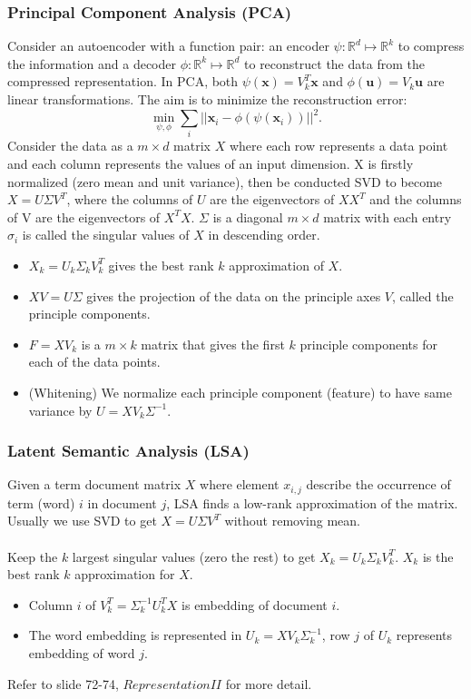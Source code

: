 \documentclass{article}
\begin{document}
   \subsubsection{Principal Component Analysis (PCA)}
   Consider an autoencoder with a function pair: an encoder $\psi:\mathbb{R}^d \mapsto \mathbb{R}^k$ to compress the information and a decoder $\phi:\mathbb{R}^k \mapsto \mathbb{R}^d$ to reconstruct the data from the compressed representation. In PCA, both $\psi(\mathbf{x})=V_k^T \mathbf{x}$ and $\phi(\mathbf{u}) = V_k \mathbf{u}$ are linear transformations. The aim is to minimize the reconstruction error: 
   \begin{equation}
   \min_{\psi, \phi} \sum_i || \mathbf{x}_i - \phi(\psi(\mathbf{x}_i)) ||^2.
   \end{equation}
   Consider the data as a $m \times d$ matrix $X$ where each row represents a data point and each column represents the values of an input dimension. X is firstly normalized (zero mean and unit variance), then be conducted SVD to become $X = U \Sigma V^T$, where the columns of $U$ are the eigenvectors of $XX^T$ and the columns of V are the eigenvectors of $X^TX$. $\Sigma$ is a diagonal $m \times d$ matrix with each entry $\sigma_i$ is called the singular values of $X$ in descending order. 
   \begin{itemize}
   \item $X_k = U_k \Sigma_k V_k^T$ gives the best rank $k$ approximation of $X$.
   \item $XV = U\Sigma$ gives the projection of the data on the principle axes $V$, called the principle components.
   \item $F=XV_k$ is a $m \times k$ matrix that gives the first $k$ principle components for each of the data points. 
   \item (Whitening) We normalize each principle component (feature) to have same variance by $U = XV_k\Sigma^{-1}$.
   \end{itemize}
   
   \subsubsection{Latent Semantic Analysis (LSA)}
   Given a term document matrix $X$ where element $x_{i,j}$ describe the occurrence of term (word) $i$ in document $j$, LSA finds a low-rank approximation of the matrix. Usually we use SVD to get $X=U\Sigma V^T$ without removing mean.
   \\\\
   Keep the $k$ largest singular values (zero the rest) to get $X_k = U_k \Sigma_k V_k^T$. $X_k$ is the best rank $k$ approximation for $X$. 
   \begin{itemize}
   \item Column $i$ of $V_k^T = \Sigma_k^{-1} U_k^T X$ is embedding of document $i$.
   \item The word embedding is represented in $U_k = XV_k\Sigma_k^{-1}$, row $j$ of $U_k$ represents embedding of word $j$.
   \end{itemize}
   Refer to slide 72-74, $Representation II$ for more detail.
   
\end{document}
